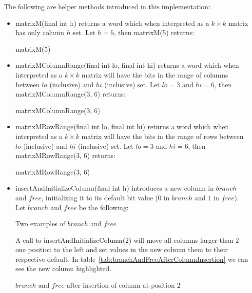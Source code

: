 The following are helper methods introduced in this implementation:
\begin{itemize}
    \item
    {\ttfamily matrixM(final int h)} returns a word which when interpreted as a $k \times k$ matrix has only column $h$ set. Let $h = 5$, then {\ttfamily matrixM(5)} returns:
    \begin{table}[H]
    \centering
    
    \caption{{\ttfamily matrixM(5)}}
    \label{tab:matrixM}
    \end{table}
    
    \item
    {\ttfamily matrixMColumnRange(final int lo, final int hi)} returns a word which when interpreted as a $k \times k$ matrix will have the bits in the range of columns between $lo$ (inclusive) and $hi$ (inclusive) set. Let $lo = 3$ and $hi = 6$, then {\ttfamily matrixMColumnRange(3, 6)} returns:
    \begin{table}[H]
    \centering
    
    \caption{{\ttfamily matrixMColumnRange(3, 6)}}
    \label{tab:MatrixColumnRange}
    \end{table}
    
    \item
    {\ttfamily matrixMRowRange(final int lo, final int hi)} returns a word which when interpreted as a $k \times k$ matrix will have the bits in the range of rows between $lo$ (inclusive) and $hi$ (inclusive) set. Let $lo = 3$ and $hi = 6$, then {\ttfamily matrixMRowRange(3, 6)} returns:
    \begin{table}[H]
    \centering
    
    \caption{{\ttfamily matrixMRowRange(3, 6)}}
    \label{tab:MatrixRowRange}
    \end{table}
    
    \item
    {\ttfamily insertAndInitializeColumn(final int h)} introduces a new column in $branch$ and $free$, initializing it to its default bit value ($0$ in $branch$ and $1$ in $free$).
    Let $branch$ and $free$ be the following:
    \begin{table}[H]
    \centering
    
    \caption{Two examples of $branch$ and $free$}
    \label{tab:branchAndFreeExample}
    \end{table}
    A call to {\ttfamily insertAndInitializeColumn(2)} will move all columns larger than $2$ one position to the left and set values in the new column them to their respective default. In table~\ref{tab:branchAndFreeAfterColumnInsertion} we can see the new column highlighted.
    \begin{table}[H]
    \centering
    
    \caption{$branch$ and $free$ after insertion of column at position $2$}
    \label{tab:branchAndFreeAfterColumnInsertion}
    \end{table}
    

\end{itemize}
